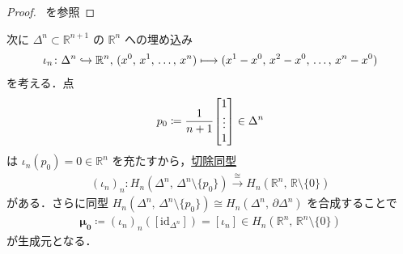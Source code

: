 \documentclass[algtopo_main]{subfiles}
\begin{document}
\begin{proof}
    ~\cite[定理4.1.10]{Nariya}を参照

\end{proof}


次に $\Delta^n \subset \mathbb{R}^{n+1}$ の $\mathbb{R}^n$ への埋め込み
\begin{align}
    \iota_n \colon \Delta^n \hookrightarrow \mathbb{R}^n,\, (x^0,\, x^1,\, \dots,\, x^n) \longmapsto (x^1-x^0,\, x^2-x^0,\, \dots,\, x^n-x^0)
\end{align}
を考える．点
\begin{align}
    p_0 \coloneqq \frac{1}{n+1} \mqty[1 \\ \vdots \\ 1] \in \Delta^n
\end{align}
は $\iota_n(p_0) = 0 \in \mathbb{R}^n$ を充たすから，\hyperref[lem:exc-Hausdorff]{切除同型}
\begin{align}
    (\iota_n)_n \colon H_n(\Delta^n,\, \Delta^n\setminus \{p_0\}) \xrightarrow{\cong} H_n(\mathbb{R}^n,\, \mathbb{R}\setminus \{0\})
\end{align}
がある．さらに同型 $H_n(\Delta^n,\, \Delta^n\setminus \{p_0\}) \cong H_n(\Delta^n,\, \partial\Delta^n)$ を合成することで
\begin{align}
    \bm{\mu_0} \coloneqq (\iota_n)_n([\mathrm{id}_{\Delta^n}]) = [\iota_n]\in H_n(\mathbb{R}^n,\, \mathbb{R}^n\setminus \{0\})
\end{align}
が生成元となる．
\end{document}
